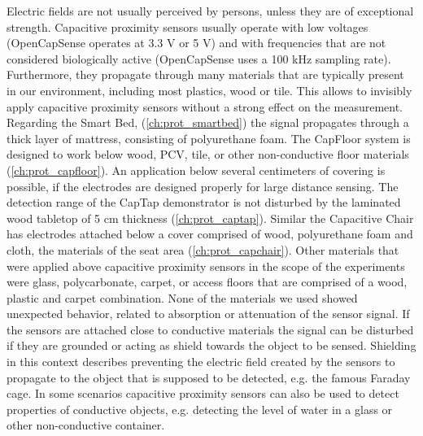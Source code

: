 Electric fields are not usually perceived by persons, unless they are of exceptional strength. Capacitive proximity sensors usually operate with low voltages (OpenCapSense operates at 3.3 V or 5 V) and with frequencies that are not considered biologically active (OpenCapSense uses a 100 kHz sampling rate). Furthermore, they propagate through many materials that are typically present in our environment, including most plastics, wood or tile. This allows to invisibly apply capacitive proximity sensors without a strong effect on the measurement. Regarding the Smart Bed, (\ref{ch:prot_smartbed}) the signal propagates through a thick layer of mattress, consisting of polyurethane foam. The CapFloor system is designed to work below wood, PCV, tile, or other non-conductive floor materials (\ref{ch:prot_capfloor}). An application below several centimeters of covering is possible, if the electrodes are designed properly for large distance sensing. The detection range of the CapTap demonstrator is not disturbed by the laminated wood tabletop of 5 cm thickness (\ref{ch:prot_captap}). Similar the Capacitive Chair has electrodes attached below a cover comprised of wood, polyurethane foam and cloth, the materials of the seat area (\ref{ch:prot_capchair}). Other materials that were applied above capacitive proximity sensors in the scope of the experiments were glass, polycarbonate, carpet, or access floors that are comprised of a wood, plastic and carpet combination. None of the materials we used showed unexpected behavior, related to absorption or attenuation of the sensor signal. If the sensors are attached close to conductive materials the signal can be disturbed if they are grounded or acting as shield towards the object to be sensed. Shielding in this context describes preventing the electric field created by the sensors to propagate to the object that is supposed to be detected, e.g. the famous Faraday cage. In some scenarios capacitive proximity sensors can also be used to detect properties of conductive objects, e.g. detecting the level of water in a glass or other non-conductive container.


